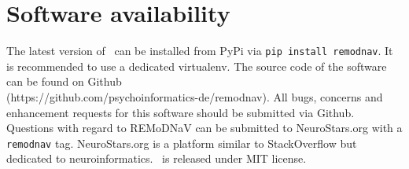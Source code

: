 




\section*{Software availability}

The latest version of \remodnav\ can be installed from PyPi via \texttt{pip
install remodnav}. It is recommended to use a dedicated virtualenv. The source
code of the software can be found on Github \\
(https://github.com/psychoinformatics-de/remodnav). All bugs, concerns and
enhancement requests for this software should be submitted via Github.
Questions with regard to REMoDNaV can be submitted to NeuroStars.org with a
\texttt{remodnav} tag. NeuroStars.org is a platform similar to StackOverflow
but dedicated to neuroinformatics.  \remodnav\ is released under MIT license.






